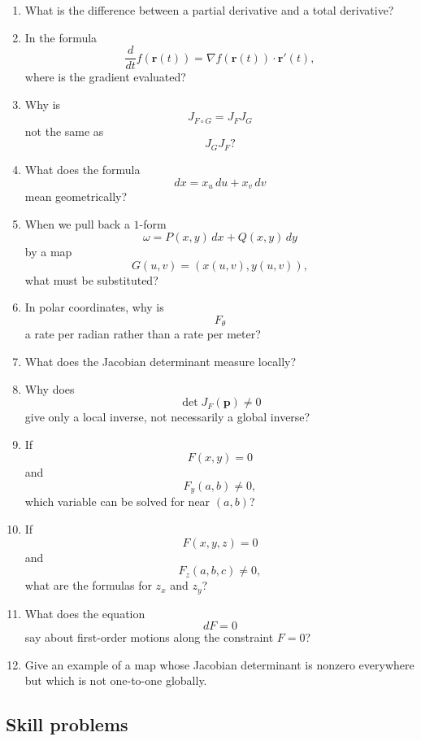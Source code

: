 \begin{enumerate}
\item What is the difference between a partial derivative and a total derivative?

\item In the formula
\[
    \frac{d}{dt}f(\mathbf r(t))
    =
    \nabla f(\mathbf r(t))\cdot\mathbf r'(t),
\]
where is the gradient evaluated?

\item Why is
\[
    J_{F\circ G}=J_FJ_G
\]
not the same as
\[
    J_GJ_F?
\]

\item What does the formula
\[
    dx=x_u\,du+x_v\,dv
\]
mean geometrically?

\item When we pull back a \(1\)-form
\[
    \omega=P(x,y)\,dx+Q(x,y)\,dy
\]
by a map
\[
    G(u,v)=(x(u,v),y(u,v)),
\]
what must be substituted?

\item In polar coordinates, why is
\[
    F_\theta
\]
a rate per radian rather than a rate per meter?

\item What does the Jacobian determinant measure locally?

\item Why does
\[
    \det J_F(\mathbf p)\ne0
\]
give only a local inverse, not necessarily a global inverse?

\item If
\[
    F(x,y)=0
\]
and
\[
    F_y(a,b)\ne0,
\]
which variable can be solved for near \((a,b)\)?

\item If
\[
    F(x,y,z)=0
\]
and
\[
    F_z(a,b,c)\ne0,
\]
what are the formulas for \(z_x\) and \(z_y\)?

\item What does the equation
\[
    dF=0
\]
say about first-order motions along the constraint \(F=0\)?

\item Give an example of a map whose Jacobian determinant is nonzero everywhere but
which is not one-to-one globally.
\end{enumerate}

\subsection{Skill problems}

